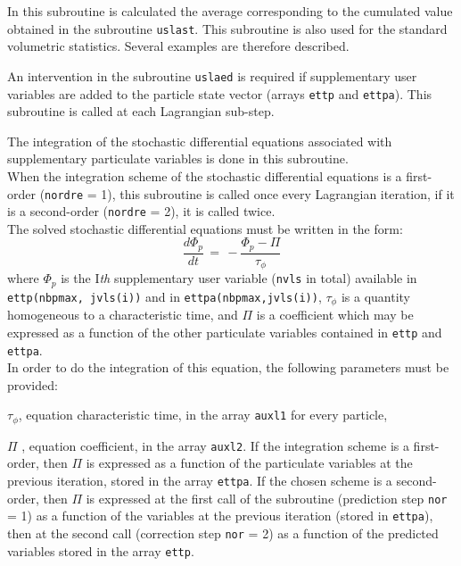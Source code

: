 {{\noindent
In this subroutine is calculated the average corresponding to the
cumulated value obtained in the subroutine \texttt{uslast}. This subroutine is
also used for the standard volumetric statistics. Several examples are
therefore described.



\noindent
An intervention in the subroutine \texttt{uslaed} is required if supplementary user
variables are added to the particle state vector (arrays \texttt{ettp}
and \texttt{ettpa}). This subroutine is called at each Lagrangian sub-step.

\noindent
The integration of the stochastic differential equations associated with
supplementary particulate variables is done in this subroutine. \\
When the integration scheme of the stochastic differential equations is
a first-order (\texttt{nordre} = 1), this subroutine is called once every
Lagrangian iteration, if it is a second-order (\texttt{nordre} = 2), it is called
twice. \\

\noindent
The solved stochastic differential equations must be written in the
form:
\begin{displaymath}
\frac{d \Phi_p}{dt} \,=\, - \frac{\Phi_p - \Pi}{\tau_\phi}
\end{displaymath}
where $\Phi_p$ is the I\textit{th} supplementary user variable (\texttt{nvls} in
total) available in \texttt{ettp(nbpmax, jvls(i))} and in
 \texttt{ettpa(nbpmax,jvls(i))},
$\tau_\phi$ is a quantity homogeneous to a characteristic time, and $\Pi$ is
a coefficient which may be expressed as a function of the other
particulate variables contained in \texttt{ettp} and \texttt{ettpa}. \\
In order to do the integration of this equation, the following
parameters must be provided:
\begin{list}{-}{}
\item $\tau_\phi$, equation characteristic time, in the array \texttt{auxl1} for
      every particle,
\item $\Pi$ , equation coefficient, in the array \texttt{auxl2}. If the
      integration scheme is a first-order, then $\Pi$ is expressed as a
      function of the particulate variables at the previous iteration,
      stored in the array \texttt{ettpa}. If the chosen scheme is a second-order,
      then $\Pi$ is expressed at the first call of the subroutine
      (prediction step \texttt{nor} = 1) as a function of the variables at the
      previous iteration (stored in \texttt{ettpa}), then at the second call
      (correction step \texttt{nor} = 2) as a function of the predicted variables
      stored in the array \texttt{ettp}.
\end{list}

}}
